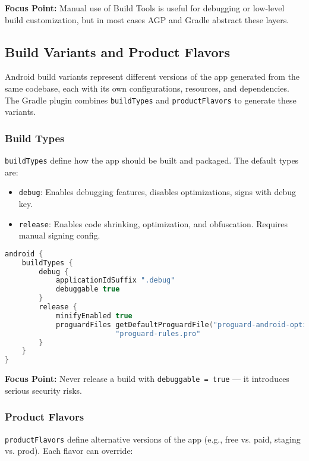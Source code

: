 \documentclass[a4paper,12pt]{article}
\begin{document}
\textbf{Focus Point:} Manual use of Build Tools is useful for debugging or low-level build customization, but in most cases AGP and Gradle abstract these layers.

\subsection{Build Variants and Product Flavors}

Android build variants represent different versions of the app generated from the same codebase, each with its own configurations, resources, and dependencies. The Gradle plugin combines \texttt{buildTypes} and \texttt{productFlavors} to generate these variants.

\subsubsection{Build Types}

\texttt{buildTypes} define how the app should be built and packaged. The default types are:

\begin{itemize}
  \item \texttt{debug}: Enables debugging features, disables optimizations, signs with debug key.
  \item \texttt{release}: Enables code shrinking, optimization, and obfuscation. Requires manual signing config.
\end{itemize}

\begin{lstlisting}[language=Kotlin]
android {
    buildTypes {
        debug {
            applicationIdSuffix ".debug"
            debuggable true
        }
        release {
            minifyEnabled true
            proguardFiles getDefaultProguardFile("proguard-android-optimize.txt"),
                          "proguard-rules.pro"
        }
    }
}
\end{lstlisting}

\textbf{Focus Point:} Never release a build with \texttt{debuggable = true} — it introduces serious security risks.

\subsubsection{Product Flavors}

\texttt{productFlavors} define alternative versions of the app (e.g., free vs. paid, staging vs. prod). Each flavor can override:
\end{document}
